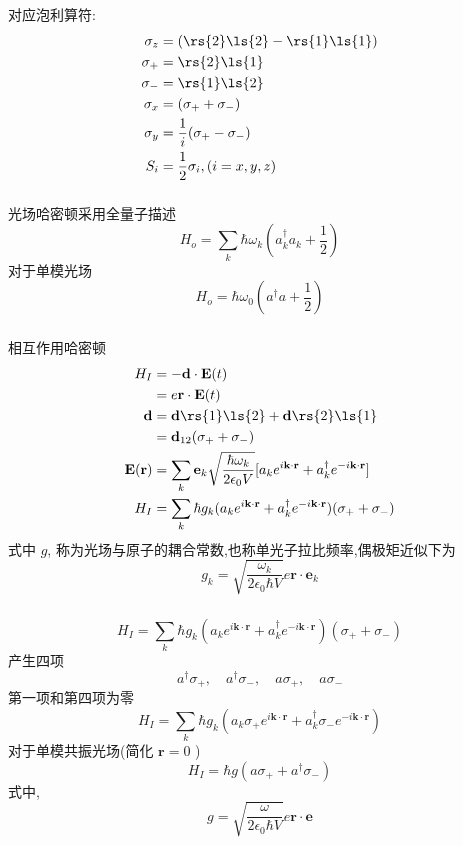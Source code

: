 \begin{frame} 
\frametitle{}
   对应泡利算符:
    \[\begin{aligned}
        \sigma_z &=  (\rs{2} \ls{2}-\rs{1} \ls{1})\\ 
        \sigma_{+} &= \rs{2} \ls{1} \\ 
        \sigma_{-} &= \rs{1} \ls{2} \\ 
        \sigma_x &= (\sigma_{+}+ \sigma_{-}) \\ 
        \sigma_y &= \frac{1}{i}(\sigma_{+}- \sigma_{-}) \\ 
        S_i & =\frac{1}{2} \sigma_i, (i=x,y,z)
    \end{aligned} \]    
\end{frame}

\begin{frame} 
\frametitle{}
{\Bullet} 光场哈密顿采用全量子描述
\[ H_o = \sum_k \hbar \omega_k (a^{\dagger} _k a_k+\frac{1}{2})\]
对于单模光场
\[ H_o =  \hbar \omega_0 (a^{\dagger}  a + \frac{1}{2})\]
\end{frame}

\begin{frame} 
\frametitle{}
{\Bullet} 相互作用哈密顿   
\[ \begin{aligned}
    H_{I} & =  - \mathbf{d}\cdot \mathbf{E}(t)\\
    &= e\mathbf{r} \cdot \mathbf{E}(t) \\
    \mathbf{d} & = \mathbf{d}\rs{1}\ls{2}  + \mathbf{d}\rs{2}\ls{1} \\ 
    &= \mathbf{d}_{12} (\sigma_+ + \sigma_-) \\ 
    \mathbf{E}(\mathbf{r}) &= \sum_k \mathbf{e}_k \sqrt{ \frac{\hbar\omega_k}{2 \epsilon_0 V}} [{a}_k e^{i \mathbf{k}\cdot \mathbf{r}} + {a}^{\dagger} _k e^{-i \mathbf{k}\cdot \mathbf{r}} ] \\ 
    H_{I} & = \sum_k  \hbar g_k ({a}_k e^{i \mathbf{k}\cdot \mathbf{r}} + {a}^{\dagger} _k e^{-i \mathbf{k}\cdot \mathbf{r}} )(\sigma_+ + \sigma_-) 
\end{aligned}\] 
式中 $g$, 称为光场与原子的耦合常数,也称单光子拉比频率,偶极矩近似下为 
\[ g_k = \sqrt{ \frac{\omega_k}{2  \epsilon_0 \hbar V}} e \mathbf{r}\cdot\mathbf{e}_k \]
\end{frame}

\begin{frame} 
\frametitle{}
     \[ H_{I}  = \sum_k  \hbar g_k ({a}_k e^{i \mathbf{k}\cdot \mathbf{r}} + {a}^{\dagger} _k e^{-i \mathbf{k}\cdot \mathbf{r}} )(\sigma_+ + \sigma_-) \]
     产生四项
     \[ {a}^{\dagger} \sigma_+, \quad {a}^{\dagger} \sigma_-, \quad {a} \sigma_+, \quad {a} \sigma_- \]
     第一项和第四项为零
     \[ H_{I}  = \sum_k  \hbar g_k ({a}_k \sigma_+ e^{i \mathbf{k}\cdot \mathbf{r}} + {a}^{\dagger} _k \sigma_- e^{-i \mathbf{k}\cdot \mathbf{r}} )\]
     对于单模共振光场(简化 $\mathbf{r}=0$ )
     \[ H_{I} = \hbar g (a\sigma_+  +  a ^{\dagger} \sigma_{-} )\]
     式中,
     \[ g = \sqrt{ \frac{\omega}{2  \epsilon_0 \hbar V}} e \mathbf{r}\cdot\mathbf{e} \]
\end{frame}

